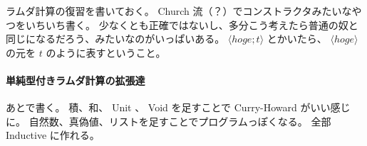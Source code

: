ラムダ計算の復習を書いておく。
Church 流（？）でコンストラクタみたいなやつをいちいち書く。
少なくとも正確ではないし、多分こう考えたら普通の奴と同じになるだろう、みたいなのがいっぱいある。
\(\langle hoge ; t \rangle\) とかいたら、 \(\langle hoge \rangle\) の元を \(t\) のように表すということ。

%

%

\paragraph*{単純型付きラムダ計算の拡張達}
あとで書く。
積、和、 Unit 、 Void を足すことで Curry-Howard がいい感じに。
自然数、真偽値、リストを足すことでプログラムっぽくなる。
全部 Inductive に作れる。
%